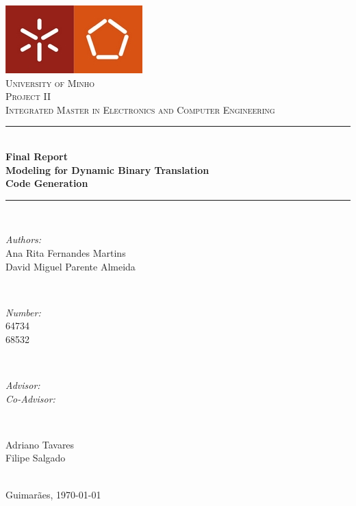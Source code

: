 \documentclass{report}
\begin{document}
	\begin{titlepage}
		\centering
		\vspace*{0.5 cm}
		\includegraphics[scale = 0.75]{Images/umee}\\[1.0 cm]
		\textsc{\LARGE University of Minho}\\[2.0 cm]
		\textsc{\Large Project II}\\[0.5 cm]		
		\textsc{\large Integrated Master in Electronics and Computer Engineering}\\[0.5 cm]				%
		\rule{\linewidth}{0.2 mm} \\[0.4 cm]
			{ \huge \bfseries Final Report} \\
            { \huge \bfseries Modeling for Dynamic Binary Translation \\
 			\LARGE \bfseries Code Generation}
			
		\rule{\linewidth}{0.2 mm} \\[1.5 cm]
			
			\begin{minipage}{0.4\textwidth}
				\begin{flushleft} \large
					\emph{Authors:}\\
					Ana Rita Fernandes Martins\\
					David Miguel Parente Almeida
				\end{flushleft}
			\end{minipage}~
			\begin{minipage}{0.4\textwidth}
				\begin{flushright} \large
					\emph{Number:} \\
					64734 \\
					68532
				\end{flushright}
			\end{minipage}\\[2 cm]
            
			\begin{minipage}{0.4\textwidth}
				\begin{flushright} \large
					\emph{Advisor:}\\
     				\emph{Co-Advisor:}
				\end{flushright}
			\end{minipage}~
			\begin{minipage}{0.4\textwidth}
				\begin{flushleft} \large
					Adriano Tavares\\
					Filipe Salgado 
				\end{flushleft}
			\end{minipage}\\[2 cm]
			
		{\large Guimarães, \today }\\[2 cm]
			
		\vfill
		
	\end{titlepage}
	
\end{document}
